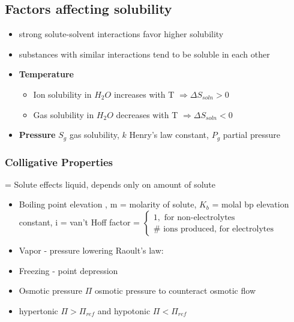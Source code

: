 \documentclass[ wastespaceontitle, english]{cheat_sheet_template}
\begin{document}
     \subsection{Factors affecting solubility}
     \begin{itemize}
         \item strong solute-solvent interactions favor higher solubility
         \item substances with similar interactions tend to be soluble in each other
         \item \textbf{Temperature}
         \begin{itemize}
             \item Ion solubility in $H_2O$ increases with T $\Rightarrow \Delta S_{soln} > 0$
             \item Gas solubility in $H_2O$ decreases with T $\Rightarrow \Delta S_{soln} < 0$
         \end{itemize}
         \item \textbf{Pressure}  $S_g$ gas solubility, $k$ Henry's law constant, $P_g$ partial pressure 
     \end{itemize}
     \subsubsection{ Colligative Properties}
     = Solute effects liquid, depends only on amount of solute
     
     \begin{itemize}
         \item Boiling point elevation , m = molarity of solute, $K_b$ = molal bp elevation constant, 
         i = van't Hoff factor = $\begin{cases}
             1,\text{ for non-electrolytes} \\
             \#\text{ ions produced, for electrolytes}
         \end{cases}$
         \item Vapor - pressure lowering Raoult's law: 
         \item Freezing - point depression 
         \item Osmotic pressure  $\Pi$ osmotic pressure to counteract osmotic flow
         \item hypertonic $\Pi > \Pi_{ref}$ and hypotonic $\Pi < \Pi_{ref}$
     \end{itemize}
\end{document}
